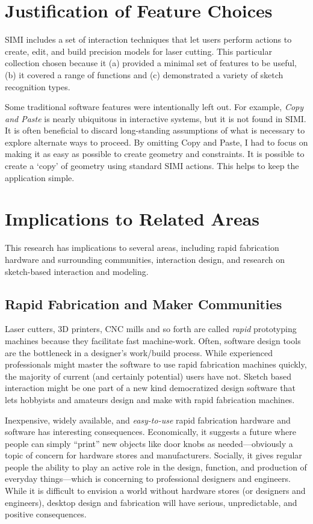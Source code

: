 \section{Justification of Feature Choices}

SIMI includes a set of interaction techniques that let users perform
actions to create, edit, and build precision models for laser
cutting. This particular collection chosen because it (a) provided a
minimal set of features to be useful, (b) it covered a range of
functions and (c) demonstrated a variety of sketch recognition types.

Some traditional software features were intentionally left out. For
example, \textit{Copy and Paste} is nearly ubiquitous in interactive
systems, but it is not found in SIMI. It is often beneficial to
discard long-standing assumptions of what is necessary to explore
alternate ways to proceed. By omitting Copy and Paste, I had to focus
on making it as easy as possible to create geometry and
constraints. It is possible to create a `copy' of geometry using
standard SIMI actions. This helps to keep the application simple.

\section{Implications to Related Areas}

This research has implications to several areas, including rapid
fabrication hardware and surrounding communities, interaction design,
and research on sketch-based interaction and modeling.

\subsection{Rapid Fabrication and Maker Communities}

Laser cutters, 3D printers, CNC mills and so forth are called
\textit{rapid} prototyping machines because they facilitate fast
machine-work. Often, software design tools are the bottleneck in a
designer's work/build process. While experienced professionals might
master the software to use rapid fabrication machines quickly, the
majority of current (and certainly potential) users have not. Sketch
based interaction might be one part of a new kind democratized design
software that lets hobbyists and amateurs design and make with rapid
fabrication machines.

Inexpensive, widely available, and \textit{easy-to-use} rapid
fabrication hardware and software has interesting
consequences. Economically, it suggests a future where people can
simply ``print'' new objects like door knobs as needed---obviously a
topic of concern for hardware stores and manufacturers. Socially, it
gives regular people the ability to play an active role in the design,
function, and production of everyday things---which is concerning to
professional designers and engineers. While it is difficult to
envision a world without hardware stores (or designers and engineers),
desktop design and fabrication will have serious, unpredictable, and
positive consequences.

